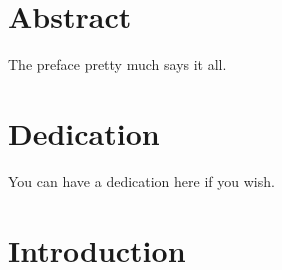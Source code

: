 \documentclass[12pt,twoside]{reedthesis}
\theoremstyle{definition}
\begin{document}
\vfill\vfill


    \tableofcontents
    \listoftables
    \listoffigures

    \chapter*{Abstract}
	The preface pretty much says it all.

	\chapter*{Dedication}
	You can have a dedication here if you wish.

  \mainmatter %
  \pagestyle{fancyplain} %


    \chapter*{Introduction}

\onehalfspacing
\end{document}
